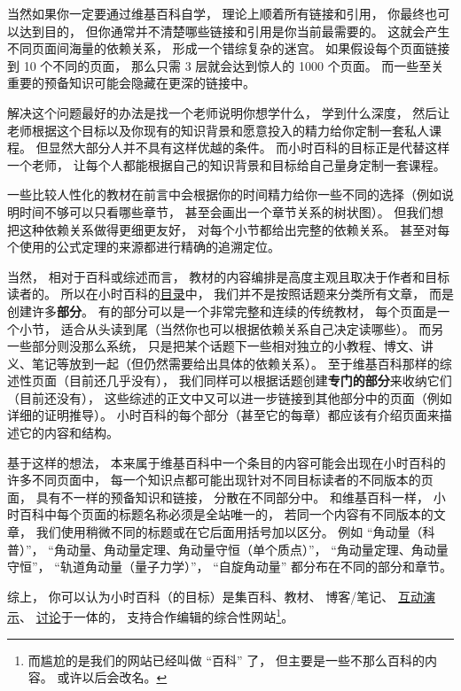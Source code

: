 当然如果你一定要通过维基百科自学， 理论上顺着所有链接和引用， 你最终也可以达到目的， 但你通常并不清楚哪些链接和引用是你当前最需要的。 这就会产生不同页面间海量的依赖关系， 形成一个错综复杂的迷宫。 如果假设每个页面链接到 10 个不同的页面， 那么只需 3 层就会达到惊人的 1000 个页面。 而一些至关重要的预备知识可能会隐藏在更深的链接中。

解决这个问题最好的办法是找一个老师说明你想学什么， 学到什么深度， 然后让老师根据这个目标以及你现有的知识背景和愿意投入的精力给你定制一套私人课程。 但显然大部分人并不具有这样优越的条件。 而小时百科的目标正是代替这样一个老师， 让每个人都能根据自己的知识背景和目标给自己量身定制一套课程。

一些比较人性化的教材在前言中会根据你的时间精力给你一些不同的选择（例如说明时间不够可以只看哪些章节， 甚至会画出一个章节关系的树状图）。 但我们想把这种依赖关系做得更细更友好， 对每个小节都给出完整的依赖关系。 甚至对每个使用的公式定理的来源都进行精确的追溯定位。

当然， 相对于百科或综述而言， 教材的内容编排是高度主观且取决于作者和目标读者的。 所以在小时百科的\href{http://wuli.wiki/online}{目录}中， 我们并不是按照话题来分类所有文章， 而是创建许多\textbf{部分}。 有的部分可以是一个非常完整和连续的传统教材， 每个页面是一个小节， 适合从头读到尾（当然你也可以根据依赖关系自己决定读哪些）。 而另一些部分则没那么系统， 只是把某个话题下一些相对独立的小教程、博文、讲义、笔记等放到一起（但仍然需要给出具体的依赖关系）。 至于维基百科那样的综述性页面（目前还几乎没有）， 我们同样可以根据话题创建\textbf{专门的部分}来收纳它们（目前还没有）， 这些综述的正文中又可以进一步链接到其他部分中的页面（例如详细的证明推导）。 小时百科的每个部分（甚至它的每章）都应该有介绍页面来描述它的内容和结构。

基于这样的想法， 本来属于维基百科中一个条目的内容可能会出现在小时百科的许多不同页面中， 每一个知识点都可能出现针对不同目标读者的不同版本的页面， 具有不一样的预备知识和链接， 分散在不同部分中。 和维基百科一样， 小时百科中每个页面的标题名称必须是全站唯一的， 若同一个内容有不同版本的文章， 我们使用稍微不同的标题或在它后面用括号加以区分。 例如 “角动量（科普）”， “角动量、角动量定理、角动量守恒（单个质点）”， “角动量定理、角动量守恒”， “轨道角动量（量子力学）”， “自旋角动量” 都分布在不同的部分和章节。

综上， 你可以认为小时百科（的目标）是集百科、教材、 博客/笔记、 \href{http://wuli.wiki/apps}{互动演示}、 \href{http://wuli.wiki/forum}{讨论}于一体的， 支持合作编辑的综合性网站\footnote{而尴尬的是我们的网站已经叫做 “百科” 了， 但主要是一些不那么百科的内容。 或许以后会改名。}。


